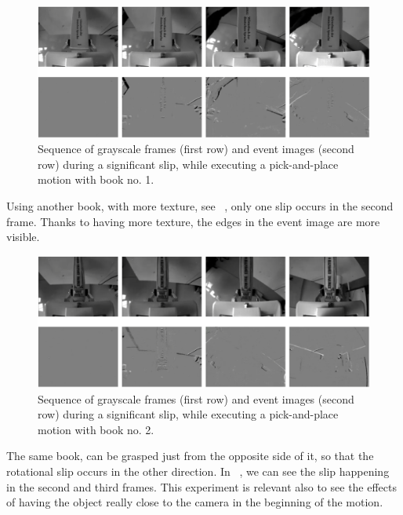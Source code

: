 \begin{figure}[h]
    \centering
    \includegraphics[width=\textwidth]{resources/images/set1_case3}
    \caption{Sequence of grayscale frames (first row) and event images (second row) during a significant slip, while executing a pick-and-place motion with book no. 1.}\label{fig:set1_case3}
\end{figure}

Using another book, with more texture, see ~, only one slip occurs in the second frame. Thanks to having more texture, the edges in the event image are more visible.\\

\begin{figure}[h]
    \centering
    \includegraphics[width=\textwidth]{resources/images/set1_case4}
    \caption{Sequence of grayscale frames (first row) and event images (second row) during a significant slip, while executing a pick-and-place motion with book no. 2.}\label{fig:set1_case4}
\end{figure}

The same book, can be grasped just from the opposite side of it, so that the rotational slip occurs in the other direction. In ~, we can see the slip happening in the second and third frames. This experiment is relevant also to see the effects of having the object really close to the camera in the beginning of the motion.\\

